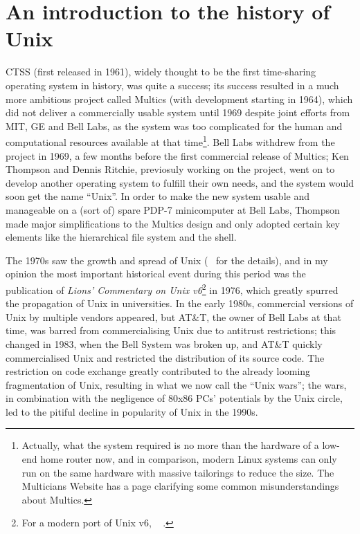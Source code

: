 \newpart
\section{An introduction to the history of Unix}\label{sec:intro}

CTSS (first released in 1961), widely thought to be the
first time-sharing operating system in history, was quite a success; its success
resulted in a much more ambitious project called Multics
(with development starting in 1964), which did not deliver a commercially usable
system until 1969 despite joint efforts from
MIT, GE and Bell Labs, as the system was too complicated for the human and
computational resources available at that time\footnote{\label{fn:multics}%
Actually, what the system required is no more than the hardware of a low-end
home router now, and in comparison, modern Linux systems can only run on the
same hardware with massive tailorings to reduce the size.  The Multicians
Website has a page clarifying some common
misunderstandings about Multics.}.  Bell Labs withdrew from the project in 1969,
a few months before the first commercial release of Multics; Ken Thompson and
Dennis Ritchie, previosuly working on the project, went on to develop another
operating system to fulfill their own needs, and the system would soon get the
name ``Unix''.  In order to make the new system usable
and manageable on a (sort of) spare PDP-7 minicomputer at Bell Labs, Thompson
made major simplifications to the Multics design and only adopted certain key
elements like the hierarchical file system and the shell.

The 1970s saw the growth and spread of Unix (\cf~\parencite{wiki:unixhist}
for the details), and in my opinion the most important historical event
during this period was the publication of \emph{Lions' Commentary on Unix
v6}\footnote{For a modern port of Unix v6, \cf~%
\parencite{wiki:xv6}.} in 1976, which greatly spurred the propagation of Unix
in universities.  In the early 1980s, commercial versions of Unix by multiple
vendors appeared, but AT\&T, the owner of Bell Labs at that time, was barred
from commercialising Unix due to antitrust restrictions; this changed in
1983, when the Bell System was broken up, and AT\&T quickly commercialised
Unix and restricted the distribution of its source code.  The restriction on
code exchange greatly contributed to the already looming fragmentation of Unix,
resulting in what we now call the ``Unix wars''; the
wars, in combination with the negligence of 80x86 PCs' potentials by the Unix
circle, led to the pitiful decline in popularity of Unix in the 1990s.

